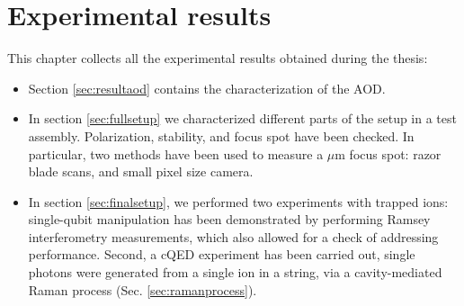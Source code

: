 
\chapter{Experimental results}
\label{ch:results}
This chapter collects all the experimental results obtained during the thesis:
\begin{itemize}
\item Section \ref{sec:resultaod} contains the characterization of the AOD.
\item In section \ref{sec:fullsetup} we characterized different parts of the setup in a test assembly. Polarization, stability, and focus spot have been checked. In particular, two methods have been used to measure a $\mu$m focus spot: razor blade scans, and small pixel size camera.
\item In section \ref{sec:finalsetup}, we performed two experiments with trapped ions: single-qubit manipulation has been demonstrated by performing Ramsey interferometry measurements, which also allowed for a check of addressing performance. Second, a cQED experiment has been carried out, single photons were generated from a single ion in a string, via a cavity-mediated Raman process (Sec. \ref{sec:ramanprocess}).
\end{itemize}
